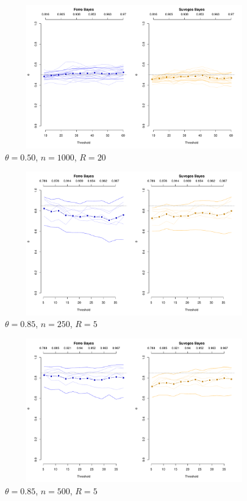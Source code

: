 \documentclass[12pt]{article}
\begin{document}
\begin{figure}
\begin{center}
\includegraphics[width=5.5in, height=2.45in]{../extremal_comparison/figs/sim_frechet_hier_50_1000_20.pdf}
\caption{$\theta=0.50$, $n=1000$, $R=20$}
\end{center}
\end{figure}





\newpage

\begin{figure}
\begin{center}
\includegraphics[width=5.5in, height=2.45in]{../extremal_comparison/figs/sim_frechet_hier_85_250_5.pdf}
\caption{$\theta=0.85$, $n=250$, $R=5$}
\end{center}
\end{figure}

\begin{figure}
\begin{center}
\includegraphics[width=5.5in, height=2.45in]{../extremal_comparison/figs/sim_frechet_hier_85_500_5.pdf}
\caption{$\theta=0.85$, $n=500$, $R=5$}
\end{center}
\end{figure}
\end{document}
